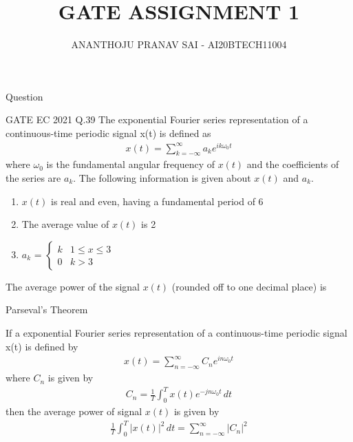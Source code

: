 \documentclass{beamer}
\title{GATE ASSIGNMENT 1}
\author{ANANTHOJU PRANAV SAI - AI20BTECH11004}
\begin{document}
\begin{frame}
\titlepage
\end{frame}
\begin{frame}{Question}
    \begin{block}{GATE EC 2021 Q.39}
    The exponential Fourier series representation of a continuous-time periodic signal x(t) is defined as 
    \begin{align}
    x(t) = \sum_{k=-\infty}^{\infty}a_{k}e^{ik\omega_0t}
    \end{align}
    where $\omega_0$ is the fundamental angular frequency of $x(t)$ and the coefficients of the series are $a_k$. The following information is given about $x(t)$ and $a_k$.
    \begin{enumerate}[label=\Roman*]
    \item $x(t)$ is real and even, having a fundamental period of 6
    \item The average value of $x(t)$ is 2
    \item $a_k$ = $\begin{cases} 
                    k & 1\leq x\leq 3\\
                    0 & k>3
                  \end{cases}$
    \end{enumerate}
The average power of the signal $x(t)$ (rounded off to one decimal place) is
    \end{block}
\end{frame}
\begin{frame}{Parseval's Theorem}
\begin{theorem}
If a exponential Fourier series representation of a continuous-time periodic signal x(t) is defined by 
\begin{align}
    x(t) = \sum_{n=-\infty}^{\infty}C_{n}e^{in\omega_0t}
\end{align}
where $C_n$ is given by
\begin{align}
    C_n = \frac{1}{T}\int_{0}^{T}x(t)e^{-jn\omega_0t}\,dt
\end{align}
then the average power of signal $x(t)$ is given by
\begin{align}
    \frac{1}{T}\int_{0}^{T}\lvert x(t)\rvert^2\,dt = \sum_{n=-\infty}^{\infty}\lvert C_n\rvert^2
\end{align}
\end{theorem}
\end{frame}
\end{document}
